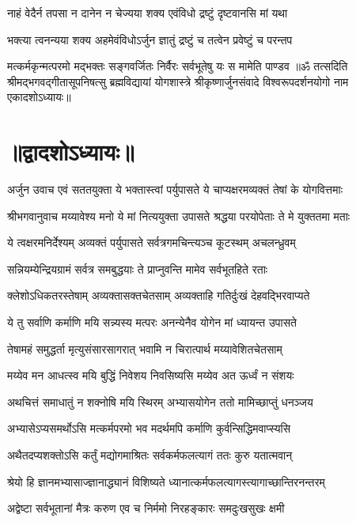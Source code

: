 \twolineshloka
{नाहं वेदैर्न तपसा न दानेन न चेज्यया}
{शक्य एवंविधो द्रष्टुं दृष्टवानसि मां यथा}%

\twolineshloka
{भक्त्या त्वनन्यया शक्य अहमेवंविधोऽर्जुन}
{ज्ञातुं द्रष्टुं च तत्वेन प्रवेष्टुं च परन्तप}%

\twolineshloka
{मत्कर्मकृन्मत्परमो मद्भक्तः सङ्गवर्जितः}
{निर्वैरः सर्वभूतेषु यः स मामेति पाण्डव}%
{॥ॐ तत्सदिति श्रीमद्भगवद्गीतासूपनिषत्सु ब्रह्मविद्यायां योगशास्त्रे श्रीकृष्णार्जुनसंवादे विश्वरूपदर्शनयोगो नाम एकादशोऽध्यायः॥}

\section{॥द्वादशोऽध्यायः॥}
{अर्जुन उवाच}
\twolineshloka
{एवं सततयुक्ता ये भक्तास्त्वां पर्युपासते}
{ये चाप्यक्षरमव्यक्तं तेषां के योगवित्तमाः}%

{श्रीभगवानुवाच}
\twolineshloka
{मय्यावेश्य मनो ये मां नित्ययुक्ता उपासते}
{श्रद्धया परयोपेताः ते मे युक्ततमा मताः}%

\twolineshloka
{ये त्वक्षरमनिर्देश्यम् अव्यक्तं पर्युपासते}
{सर्वत्रगमचिन्त्यञ्च कूटस्थम् अचलन्ध्रुवम्}%

\twolineshloka
{सन्नियम्येन्द्रियग्रामं सर्वत्र समबुद्धयाः}
{ते प्राप्नुवन्ति मामेव सर्वभूतहिते रताः}%

\twolineshloka
{क्लेशोऽधिकतरस्तेषाम् अव्यक्तासक्तचेतसाम्}%
{अव्यक्ताहि गतिर्दुःखं देहवद्भिरवाप्यते}%

\twolineshloka
{ये तु सर्वाणि कर्माणि मयि सन्न्यस्य मत्परः}
{अनन्येनैव योगेन मां ध्यायन्त उपासते}%

\twolineshloka
{तेषामहं समुद्धर्ता मृत्युसंसारसागरात्}
{भवामि न चिरात्पार्थ मय्यावेशितचेतसाम्}%

\twolineshloka
{मय्येव मन आधत्स्व मयि बुद्धिं निवेशय}
{निवसिष्यसि मय्येव अत ऊर्ध्वं न संशयः}%

\twolineshloka
{अथचित्तं समाधातुं न शक्नोषि मयि स्थिरम्}
{अभ्यासयोगेन ततो मामिच्छाप्तुं धनञ्जय}%

\twolineshloka
{अभ्यासेऽप्यसमर्थोऽसि मत्कर्मपरमो भव}
{मदर्थमपि कर्माणि कुर्वन्सिद्धिमवाप्स्यसि}%

\twolineshloka
{अथैतदप्यशक्तोऽसि कर्तुं मद्योगमाश्रितः}
{सर्वकर्मफलत्यागं ततः कुरु यतात्मवान्}%

\twolineshloka
{श्रेयो हि ज्ञानमभ्यासाज्ज्ञानाद्ध्यानं विशिष्यते}
{ध्यानात्कर्मफलत्यागस्त्यागाच्छान्तिरनन्तरम्}%

\twolineshloka
{अद्वेष्टा सर्वभूतानां मैत्रः करुण एव च}
{निर्ममो निरहङ्कारः समदुःखसुखः क्षमी}%

